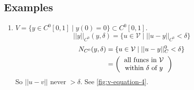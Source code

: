 \documentclass[12pt,twoside]{article}
\begin{document}
\subsection{Examples}
\begin{enumerate}
\item
  $V=\{y\in C^0[0,1]\;|\;y(0)=0\}\subset C^0[0,1]$.
  $$||y||_{C^0}(y,\delta)=\{u\in\mathcal{V}\;|\; ||u-y||_{C^0}<\delta\}$$
  \begin{equation*}
    \begin{aligned}
      N_{C^0}(y,\delta)&=\{u\in\mathcal{V}\;|\; ||u-y||_C^0<\delta\} \\
      &= \left( \text{\parbox{7em}{\centering all funcs in $\mathcal{V}$ within
            $\delta$ of $y$}} \right) \\
    \end{aligned}
  \end{equation*}
  So $||u-v||$ never $>\delta$. See \cref{fig:v-equation-4}.


\end{enumerate}
\end{document}
